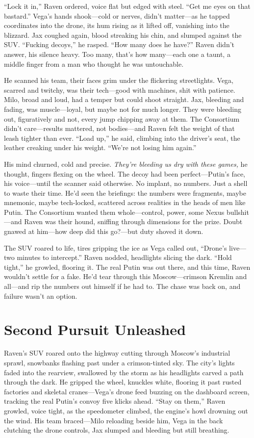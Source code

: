 \documentclass[12pt]{book}
\begin{document}
“Lock it in,” Raven ordered, voice flat but edged with steel. “Get me eyes on that bastard.” Vega’s hands shook—cold or nerves, didn’t matter—as he tapped coordinates into the drone, its hum rising as it lifted off, vanishing into the blizzard. Jax coughed again, blood streaking his chin, and slumped against the SUV. “Fucking decoys,” he rasped. “How many does he have?” Raven didn’t answer, his silence heavy. Too many, that’s how many—each one a taunt, a middle finger from a man who thought he was untouchable.

He scanned his team, their faces grim under the flickering streetlights. Vega, scarred and twitchy, was their tech—good with machines, shit with patience. Milo, broad and loud, had a temper but could shoot straight. Jax, bleeding and fading, was muscle—loyal, but maybe not for much longer. They were bleeding out, figuratively and not, every jump chipping away at them. The Consortium didn’t care—results mattered, not bodies—and Raven felt the weight of that leash tighter than ever. “Load up,” he said, climbing into the driver’s seat, the leather creaking under his weight. “We’re not losing him again.”

His mind churned, cold and precise. \textit{They’re bleeding us dry with these games,} he thought, fingers flexing on the wheel. The decoy had been perfect—Putin’s face, his voice—until the scanner said otherwise. No implant, no numbers. Just a shell to waste their time. He’d seen the briefings: the numbers were fragments, maybe mnemonic, maybe tech-locked, scattered across realities in the heads of men like Putin. The Consortium wanted them whole—control, power, some Nexus bullshit—and Raven was their hound, sniffing through dimensions for the prize. Doubt gnawed at him—how deep did this go?—but duty shoved it down.

The SUV roared to life, tires gripping the ice as Vega called out, “Drone’s live—two minutes to intercept.” Raven nodded, headlights slicing the dark. “Hold tight,” he growled, flooring it. The real Putin was out there, and this time, Raven wouldn’t settle for a fake. He’d tear through this Moscow—crimson Kremlin and all—and rip the numbers out himself if he had to. The chase was back on, and failure wasn’t an option.


\section{Second Pursuit Unleashed}

Raven’s SUV roared onto the highway cutting through Moscow’s industrial sprawl, snowbanks flashing past under a crimson-tinted sky. The city’s lights faded into the rearview, swallowed by the storm as his headlights carved a path through the dark. He gripped the wheel, knuckles white, flooring it past rusted factories and skeletal cranes—Vega’s drone feed buzzing on the dashboard screen, tracking the real Putin’s convoy five klicks ahead. “Stay on them,” Raven growled, voice tight, as the speedometer climbed, the engine’s howl drowning out the wind. His team braced—Milo reloading beside him, Vega in the back clutching the drone controls, Jax slumped and bleeding but still breathing.
\end{document}
